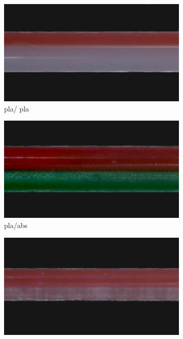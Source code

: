  \begin{figure}[!h]
     \centering
     \begin{subfigure}[]{.29\textwidth}
         \centering
         \includegraphics[width=\textwidth]{Abbildungen/Versuche/plapla_n.jpg}
         \caption{\acs{pla}/ \acs{pla}} 
         \label{fig:probe2_f}
     \end{subfigure}
     \hspace{5mm}
     \begin{subfigure}[]{.29\textwidth}
         \includegraphics[width=\textwidth]{Abbildungen/Versuche/abspla_n.jpg}
         \caption{\acs{pla}/\acs{abs}}
         \label{fig:probe3_f}
     \end{subfigure}
     \hspace{5mm}
     \begin{subfigure}[]{.29\textwidth}
        \centering
        \includegraphics[width=\textwidth]{Abbildungen/Versuche/petgpla_n.jpg}

\end{subfigure}
\end{figure}
